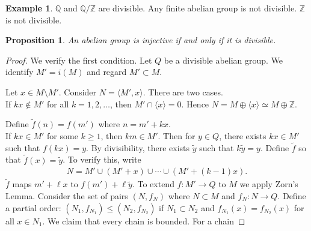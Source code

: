 \documentclass[12pt]{article}
\theoremstyle{plain}
\newtheorem{proposition}[theorem]{Proposition}
\theoremstyle{remark}
\theoremstyle{definition}
\newtheorem{example}[theorem]{Example}
\newcommand{\Z}{\mathbb{Z}}
\newcommand{\Q}{\mathbb{Q}}
\begin{document}
\begin{example}
    $\Q$ and $\Q/\Z$ are divisible. Any finite abelian group is not divisible. $\Z$ is not divisible.
\end{example}

\begin{proposition}
    An abelian group is injective if and only if it is divisible.
\end{proposition}
\begin{proof}
    We verify the first condition. Let $Q$ be a divisible abelian group. We identify $M'=i(M)$ and regard $M'\subset M$.
    \begin{figure}[H]
        \centering
    \end{figure}
    \noindent Let $x\in M\setminus M'$. Consider $N=\langle M',x\rangle$. There are two cases. \\
    If $kx\notin M'$ for all $k=1,2,\dots$, then $M'\cap \langle x\rangle = 0$. Hence $N=M\oplus \langle x\rangle \simeq M\oplus \Z$.
    \begin{figure}[H]
        \centering
    \end{figure}
    \noindent Define $\tilde{f}(n)=f(m')$ where $n=m'+kx$. \\
    If $kx\in M'$ for some $k\ge 1$, then $km\in M'$. Then for $y\in Q$, there exists $kx\in M'$ such that $f(kx)=y$. By divisibility, there exists $\tilde{y}$ such that $k\tilde{y}=y$. Define $\tilde{f}$ so that $\tilde{f}(x)=\tilde{y}$. To verify this, write
    \begin{align*}
        N=M'\cup (M'+x)\cup \cdots \cup (M'+(k-1)x).
    \end{align*}
    $\tilde{f}$ maps $m'+\ell x$ to $f(m')+\ell\tilde{y}$. To extend $f:M'\rightarrow Q$ to $M$ we apply Zorn's Lemma. Consider the set of pairs $(N,f_N)$ where $N\subset M$ and $f_N:N\rightarrow Q$. Define a partial order: $(N_1,f_{N_1})\le (N_2,f_{N_2})$ if $N_1\subset N_2$ and $f_{N_1}(x)=f_{N_2}(x)$ for all $x\in N_1$. We claim that every chain is bounded. For a chain

\end{proof}
\end{document}
